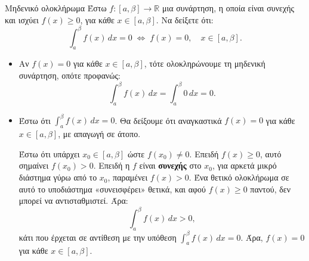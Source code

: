\begin{Protashmabox}{Μηδενικό ολοκλήρωμα}
Έστω $f : [a,\beta] \to \mathbb{R}$ μια συνάρτηση, η οποία είναι συνεχής και ισχύει
$f(x) \geq 0$, για κάθε $x \in [a,\beta]$. Να δείξετε ότι:
\[
  \int_{a}^{\beta} f(x)\,dx = 0 \;\Leftrightarrow\; f(x) = 0, \quad x \in [a,\beta].
\]
\end{Protashmabox}
\apodeixi
\vspace{-3mm}
\begin{itemize}
  \item[$(\Leftarrow)$] Αν $f(x) = 0$ για κάθε $x \in [a,\beta]$, τότε ολοκληρώνουμε
  τη μηδενική συνάρτηση, οπότε προφανώς:
  \[
    \int_{a}^{\beta} f(x)\,dx = \int_{a}^{\beta} 0\,dx = 0.
  \]

  \item[$(\Rightarrow)$] Έστω ότι $\displaystyle\int_{a}^{\beta} f(x)\,dx = 0$. Θα δείξουμε
  ότι αναγκαστικά $f(x) = 0$ για κάθε $x \in [a,\beta]$, με {απαγωγή σε άτοπο}.

  Έστω ότι υπάρχει $x_0 \in [a,\beta]$ ώστε $f(x_0) \neq 0$.
  Επειδή $f(x) \geq 0$, αυτό σημαίνει $f(x_0) > 0$.
  Επειδή η $f$ είναι \textbf{συνεχής} στο $x_0$, για αρκετά μικρό διάστημα
  γύρω από το $x_0$, παραμένει $f(x) > 0$.
  Ένα θετικό ολοκλήρωμα σε αυτό το υποδιάστημα «συνεισφέρει» θετικά, και
  αφού $f(x) \geq 0$ παντού, δεν μπορεί να αντισταθμιστεί. Άρα:
  \[
    \int_{a}^{\beta} f(x)\,dx > 0,
  \]
  κάτι που έρχεται σε αντίθεση με την υπόθεση $\displaystyle\int_{a}^{\beta} f(x)\,dx = 0$. Άρα, $f(x) = 0$ για κάθε $x \in [a,\beta]$.
\end{itemize}
